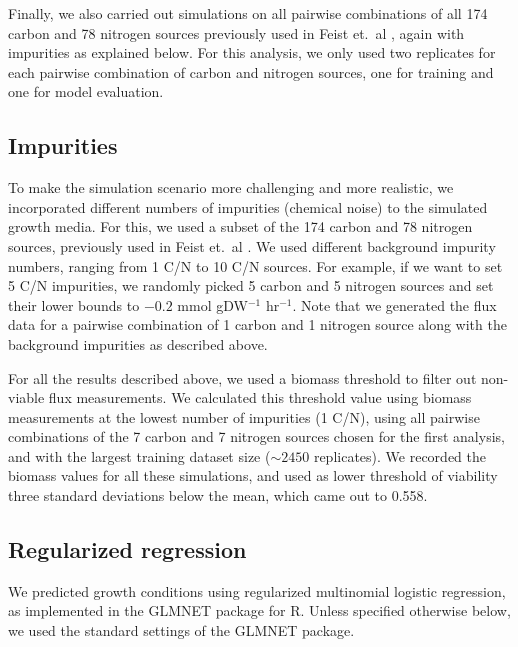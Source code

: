 \documentclass[12pt]{article}
\begin{document}
Finally, we also carried out simulations on all pairwise combinations of all 174 carbon and 78 nitrogen sources previously used in Feist et.\ al \cite{Feistetal2007}, again with impurities as explained below. For this analysis, we only used two replicates for each pairwise combination of carbon and nitrogen sources, one for training and one for model evaluation.

\subsection{Impurities}
To make the simulation scenario more challenging and more realistic, we incorporated different numbers of impurities (chemical noise) to the simulated growth media. For this, we used a subset of the 174 carbon and 78 nitrogen sources, previously used in Feist et.\ al \cite{Feistetal2007}.  We used different background impurity numbers, ranging from 1 C/N to 10 C/N sources. For example, if we want to set 5 C/N impurities, we randomly picked 5 carbon and 5 nitrogen sources and set their lower bounds to $-0.2$ mmol gDW$^{-1}$ hr$^{-1}$. Note that we generated the flux data for a pairwise combination of 1 carbon and 1 nitrogen source along with the background impurities as described above. 

For all the results described above, we used a biomass threshold to filter out non-viable flux measurements. We calculated this threshold value using biomass measurements at the lowest number of impurities (1 C/N), using all pairwise combinations of the 7 carbon and 7 nitrogen sources chosen for the first analysis, and with the largest training dataset size ($\sim2450$ replicates). We recorded the biomass values for all these simulations, and used as lower threshold of viability three standard deviations below the mean, which came out to 0.558.

\subsection{Regularized regression}

We predicted growth conditions using regularized multinomial logistic regression, as implemented in the GLMNET package \cite{Friedmanetal2010} for R. Unless specified otherwise below, we used the standard settings of the GLMNET package.
\end{document}
